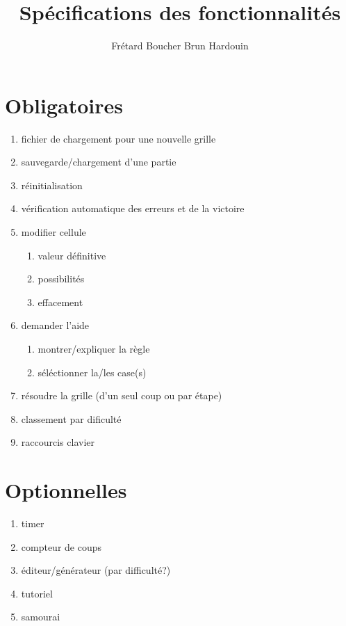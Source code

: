 \documentclass[a4paper,10pt]{report}
\title{Spécifications des fonctionnalités}
\author{Frétard Boucher Brun Hardouin}
\begin{document}
\maketitle

\section*{Obligatoires}

\begin{enumerate}
 \item fichier de chargement pour une nouvelle grille
 \item sauvegarde/chargement d'une partie
 \item réinitialisation
 \item vérification automatique des erreurs et de la victoire
 \item modifier cellule
 \begin{enumerate}
  \item valeur définitive
  \item possibilités
  \item effacement
 \end{enumerate}
 \item demander l'aide
 \begin{enumerate}
  \item montrer/expliquer la règle
  \item séléctionner la/les case(s)
 \end{enumerate}
 \item résoudre la grille (d'un seul coup ou par étape)
 \item classement par dificulté
 \item raccourcis clavier
\end{enumerate}

\section*{Optionnelles}

\begin{enumerate}
 \item timer
 \item compteur de coups
 \item éditeur/générateur (par difficulté?)
 \item tutoriel
 \item samourai
\end{enumerate}
\end{document}
